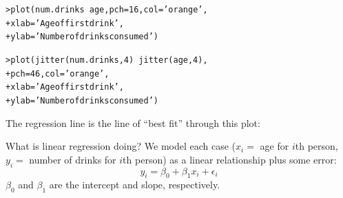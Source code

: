 \documentclass{beamer}\usepackage[]{graphicx}\usepackage[]{color}
\makeatletter
\newcommand{\hlnum}[1]{\textcolor[rgb]{0.824,0.412,0.118}{#1}}%
\newcommand{\hlstr}[1]{\textcolor[rgb]{1,0.894,0.71}{#1}}%
\newcommand{\hlopt}[1]{\textcolor[rgb]{1,0.894,0.769}{#1}}%
\newcommand{\hlstd}[1]{\textcolor[rgb]{1,0.894,0.769}{#1}}%
\newcommand{\hlkwc}[1]{\textcolor[rgb]{0.78,0.941,0.545}{#1}}%
\newcommand{\hlkwd}[1]{\textcolor[rgb]{1,0.78,0.769}{#1}}%
\newenvironment{kframe}{%
 \def\at@end@of@kframe{}%
 \ifinner\ifhmode%
  \def\at@end@of@kframe{\end{minipage}}%
  \begin{minipage}{\columnwidth}%
 \fi\fi%
 \def\FrameCommand##1{\hskip\@totalleftmargin \hskip-\fboxsep
 \colorbox{shadecolor}{##1}\hskip-\fboxsep
     \hskip-\linewidth \hskip-\@totalleftmargin \hskip\columnwidth}%
 \MakeFramed {\advance\hsize-\width
   \@totalleftmargin\z@ \linewidth\hsize
   \@setminipage}}%
 {\par\unskip\endMakeFramed%
 \at@end@of@kframe}
\newenvironment{knitrout}{}{} %
\makeatother
\begin{document}
\begin{darkframes}
\begin{frame}[fragile]
\begin{knitrout}
\end{knitrout}
    \end{frame}


    \begin{frame}[fragile]
\begin{knitrout}
\begin{kframe}
\begin{alltt}
\hlstd{> }\hlkwd{plot}\hlstd{(num.drinks} \hlopt{~} \hlstd{age,} \hlkwc{pch}\hlstd{=}\hlnum{16}\hlstd{,} \hlkwc{col}\hlstd{=}\hlstr{'orange'}\hlstd{,}
\hlstd{+ }  \hlkwc{xlab}\hlstd{=}\hlstr{'Age of first drink'}\hlstd{,}
\hlstd{+ }  \hlkwc{ylab}\hlstd{=}\hlstr{'Number of drinks consumed'}\hlstd{)}
\end{alltt}
\end{kframe}


\end{knitrout}
    \end{frame}

    \begin{frame}[fragile]
\begin{knitrout}
\begin{kframe}
\begin{alltt}
\hlstd{> }\hlkwd{plot}\hlstd{(}\hlkwd{jitter}\hlstd{(num.drinks,} \hlnum{4}\hlstd{)} \hlopt{~} \hlkwd{jitter}\hlstd{(age,} \hlnum{4}\hlstd{),}
\hlstd{+ }  \hlkwc{pch}\hlstd{=}\hlnum{46}\hlstd{,} \hlkwc{col}\hlstd{=}\hlstr{'orange'}\hlstd{,}
\hlstd{+ }  \hlkwc{xlab}\hlstd{=}\hlstr{'Age of first drink'}\hlstd{,}
\hlstd{+ }  \hlkwc{ylab}\hlstd{=}\hlstr{'Number of drinks consumed'}\hlstd{)}
\end{alltt}
\end{kframe}


\end{knitrout}
    \end{frame}

    \begin{frame}[fragile]
      The regression line is the line of ``best fit'' through this plot:
\begin{knitrout}


\end{knitrout}
      \lc
    \end{frame}

    \begin{frame}{What is linear regression doing?}
      We model each case ($x_i=$ age for $i$th person, $y_i=$ number of drinks for $i$th person) as a linear relationship plus some error:
      \[
        y_i = \beta_0 + \beta_1 x_i + \epsilon_i
      \]
      $\beta_0$ and $\beta_1$ are the intercept and slope, respectively.
      \bigskip\pause


\end{frame}
\end{darkframes}
\end{document}
